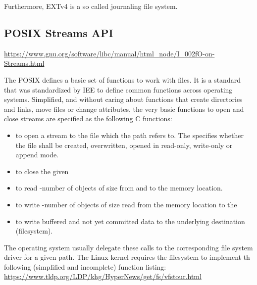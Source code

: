 
Furthermore, EXTv4 is a so called journaling file system.



\subsection{POSIX Streams API}

\url{https://www.gnu.org/software/libc/manual/html_node/I_002fO-on-Streams.html}

The POSIX  defines a basic set of functions to work with files.
It is a standard that was standardized by IEE  to define common functions across operating systems.
Simplified, and without caring about functions that create directories and links, move files or change attributes, the very basic functions to open and close streams are specified as the following C functions:

\begin{itemize}
	\item {} to open a stream to the file which the path  refers to. The  specifies whether the file shall be created, overwritten, opened in read-only, write-only or append mode.
	\item {} to close the given 
	\item {} to read  -number of objects of  size  from   and to the  memory location.
	\item {} to write -number of objects of size  read from the  memory location to the 
	\item {} to write buffered and not yet committed data to the underlying destination (filesystem).
\end{itemize}

The operating system usually delegate these calls to the corresponding file system driver for a given path.
The Linux kernel requires the filesystem to implement th following (simplified and incomplete) function listing:
\url{https://www.tldp.org/LDP/khg/HyperNews/get/fs/vfstour.html}

